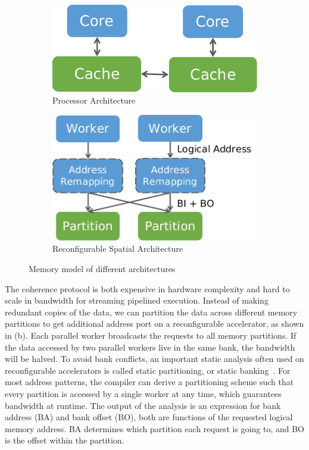 \begin{figure}
  \begin{subfigure}[b]{0.35\textwidth}
  \centering
  \includegraphics[width=1\columnwidth]{figs/cpumemmodel.pdf}
  \caption{Processor Architecture}
  \end{subfigure}
  \hfill
  \begin{subfigure}[b]{0.45\textwidth}
  \centering
  \includegraphics[width=1\columnwidth]{figs/spatialmemmodel.pdf}
  \caption{Reconfigurable Spatial Architecture}
  \end{subfigure}
  \caption[Memory model of different architectures]{Memory model of different architectures}
  \label{fig:memmodel}
\end{figure}

The coherence protocol is both expensive in hardware complexity and hard to scale in bandwidth for
streaming pipelined execution.
Instead of making redundant copies of the data, we can partition the data across different memory
partitions to get additional address port on a reconfigurable accelerator, as shown in
 (b).
Each parallel worker broadcasts the requests to all memory partitions.
If the data accessed by two parallel workers live in the same bank, the bandwidth will be halved.
To avoid bank conflicts, an important static analysis often used on reconfigurable accelerators is called static partitioning, or static banking~\cite{poly_cong}.
For most address patterns, the compiler can derive a partitioning scheme such that every partition is accessed by a
single worker at any time, which guarantees bandwidth at runtime.
The output of the analysis is an expression for bank address (BA) and bank offset (BO), both are
functions of the requested logical memory address.
BA determines which partition each request is going to, and BO is the offset within the
partition.

